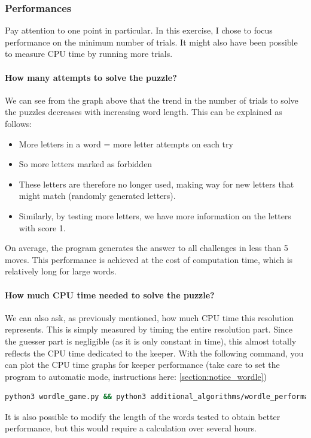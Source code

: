 \documentclass[10pt,a4paper,hidelinks]{article}
\begin{document}
\subsubsection{Performances}
Pay attention to one point in particular. In this exercise, I chose to focus performance on the minimum number of trials. It might also have been possible to measure CPU time by running more trials.
\paragraph{How many attempts to solve the puzzle?}
We can see from the graph above that the trend in the number of trials to solve the puzzles decreases with increasing word length. This can be explained as follows:
\begin{itemize}
    \item More letters in a word = more letter attempts on each try
    \item So more letters marked as forbidden
    \item These letters are therefore no longer used, making way for new letters that might match (randomly generated letters).
    \item Similarly, by testing more letters, we have more information on the letters with score 1.
\end{itemize}

On average, the program generates the answer to all challenges in less than 5 moves. This performance is achieved at the cost of computation time, which is relatively long for large words.

\paragraph{How much CPU time needed to solve the puzzle?}
We can also ask, as previously mentioned, how much CPU time this resolution represents. This is simply measured by timing the entire resolution part. Since the guesser part is negligible (as it is only constant in time), this almost totally reflects the CPU time dedicated to the keeper. With the following command, you can plot the CPU time graphs for keeper performance (take care to set the program to automatic mode, instructions here: \ref{section:notice_wordle})

\begin{lstlisting}[language=Bash]
python3 wordle_game.py && python3 additional_algorithms/wordle_performance.py
\end{lstlisting}
It is also possible to modify the length of the words tested to obtain better performance, but this would require a calculation over several hours.

\end{document}
